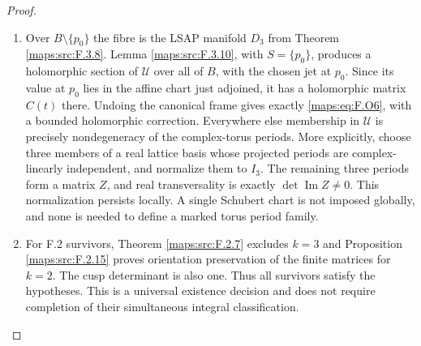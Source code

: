 \begin{proof}
\begin{enumerate}[label=\arabic*.]
\item Over $B\setminus\{p_0\}$ the fibre is the LSAP manifold
$D_3$ from Theorem \ref{maps:src:F.3.8}.  Lemma \ref{maps:src:F.3.10}, with $S=\{p_0\}$,
produces a holomorphic section of $\mathscr U$ over all of
$B$, with the chosen jet at $p_0$.  Since its value at $p_0$
lies in the affine chart just adjoined, it has a holomorphic
matrix $C(t)$ there.  Undoing the canonical frame gives
exactly \eqref{maps:eq:F.O6}, with a bounded holomorphic correction.
Everywhere else membership in $\mathscr U$ is precisely
nondegeneracy of the complex-torus periods.
More explicitly, choose three members of a real lattice basis
whose projected periods are complex-linearly independent, and
normalize them to $I_3$.  The remaining three periods form a
matrix $Z$, and real transversality is exactly
$\det\operatorname{Im}Z\ne0$.  This normalization persists
locally.  A single Schubert chart is not imposed globally,
and none is needed to define a marked torus period family.

\item For F.2 survivors, Theorem \ref{maps:src:F.2.7} excludes $k=3$ and
Proposition \ref{maps:src:F.2.15} proves orientation preservation of the
finite matrices for $k=2$.  The cusp determinant is also one.
Thus all survivors satisfy the hypotheses.  This is a
universal existence decision and does not require completion
of their simultaneous integral classification.

\end{enumerate}
\end{proof}

